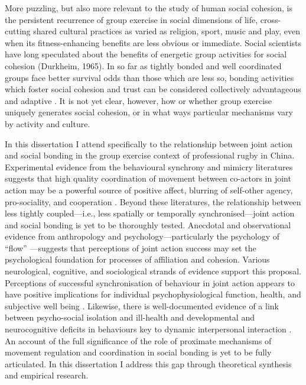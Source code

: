 More puzzling, but also more relevant to the study of human social cohesion, is the persistent recurrence of group exercise in social dimensions of life, cross-cutting shared cultural practices as varied as religion, sport, music and play, even when its fitness-enhancing benefits are less obvious or immediate.  Social scientists have long speculated about the benefits of energetic group activities for social cohesion (Durkheim, 1965). In so far as tightly bonded and well coordinated groups face better survival odds than those which are less so, bonding activities which foster social cohesion and trust can be considered collectively advantageous and adaptive \citep{Dunbar2010}.  It is not yet clear, however, how or whether group exercise uniquely generates social cohesion, or in what ways particular mechanisms vary by activity and culture.

In this dissertation I attend specifically to the relationship between joint action and social bonding in the group exercise context of professional rugby in China.  Experimental evidence from the behavioural synchrony and mimicry literatures suggests that high quality coordination of movement between co-actors in joint action may be a powerful source of positive affect, blurring of self-other agency, pro-sociality, and cooperation \citep{Mogan2017}.  Beyond these literatures, the relationship between less tightly coupled---i.e., less spatially or temporally synchronised---joint action and social bonding is yet to be thoroughly tested. Anecdotal and observational evidence from anthropology and psychology---particularly the psychology of ``flow'' \citep{Csikszentmihalyi1992,Jackson1999}---suggests that perceptions of joint action success may set the psychological foundation for processes of affiliation and cohesion.  Various neurological, cognitive, and sociological strands of evidence support this proposal.  Perceptions of successful synchronisation of behaviour in joint action appears to have positive implications for individual psychophysiological function, health, and subjective well being \citep{Wheatley2012}.  Likewise, there is well-documented evidence of a link between psycho-social isolation and ill-health and developmental and neurocognitive deficits in behaviours key to dynamic interpersonal interaction \citep[e.g.][]{Blakemore2005,Baron-Cohen1991}. An account of the full significance of the role of proximate mechanisms of movement regulation and coordination in social bonding is yet to be fully articulated. In this dissertation I address this gap through theoretical synthesis and empirical research.




